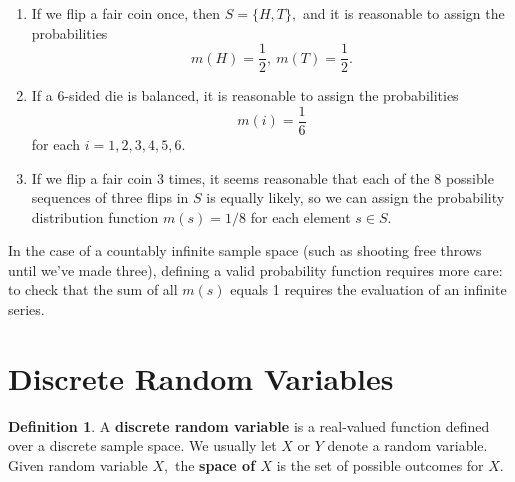 \documentclass[
]{book}
\theoremstyle{definition}
\newtheorem{definition}{Definition}[chapter]
\theoremstyle{definition}
\theoremstyle{definition}
\theoremstyle{definition}
\theoremstyle{remark}
\begin{document}
\begin{enumerate}
\def\labelenumi{\arabic{enumi}.}
\item
  If we flip a fair coin once, then \(S = \{H,T\},\) and it is reasonable to assign the probabilities \[m(H) = \frac{1}{2}, ~ m(T) = \frac{1}{2}.\]
\item
  If a 6-sided die is balanced, it is reasonable to assign the probabilities \[m(i) = \frac{1}{6}\] for each \(i = 1, 2, 3, 4, 5, 6\).
\item
  If we flip a fair coin 3 times, it seems reasonable that each of the 8 possible sequences of three flips in \(S\) is equally likely, so we can assign the probability distribution function \(m(s) = 1/8\) for each element \(s \in S\).
\end{enumerate}

In the case of a countably infinite sample space (such as shooting free throws until we've made three), defining a valid probability function requires more care: to check that the sum of all \(m(s)\) equals 1 requires the evaluation of an infinite series.

\section{Discrete Random Variables}\label{discrete-rv-initial}

\begin{definition}
\protect\hypertarget{def:random-variable}{}\label{def:random-variable}A \textbf{discrete random variable} is a real-valued function defined over a discrete sample space. We usually let \(X\) or \(Y\) denote a random variable. Given random variable \(X,\) the \textbf{space of \(X\)} is the set of possible outcomes for \(X\).
\end{definition}
\end{document}
